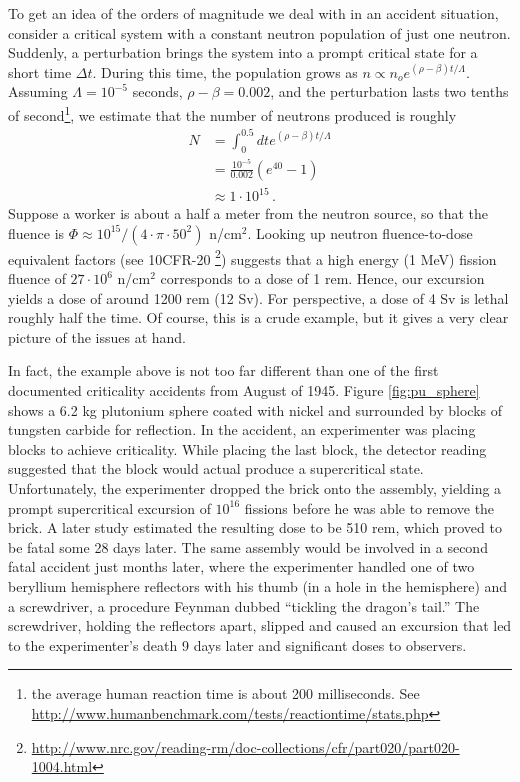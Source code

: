 To get an idea of the orders of magnitude we deal with in an accident
situation, consider a critical system with a constant neutron population
of just one neutron.  Suddenly, a perturbation brings the system
into a prompt critical state for a short time $\Delta t$.  During this
time, the population grows as $n \propto n_o e^{(\rho-\beta)t/\Lambda}$.  
Assuming $\Lambda = 10^{-5}$ seconds, $\rho-\beta = 0.002$, and the perturbation 
lasts two tenths of second\footnote{the average human reaction time is
about 200 milliseconds. 
See \url{http://www.humanbenchmark.com/tests/reactiontime/stats.php}}, 
we estimate that the number of neutrons produced is 
roughly
\begin{equation}
\begin{split}
 N &= \int^{0.5}_0 dt e^{(\rho-\beta)t/\Lambda} \\
   &= \frac{10^{-5}}{0.002} (e^{40} - 1) \\
   &\approx 1 \cdot 10^{15} \, .
\end{split}
\end{equation}
Suppose a worker is about a half a meter from the neutron source, so that
the fluence is $\Phi \approx 10^{15} / (4\cdot \pi \cdot 50^2)$ n/cm$^2$.
Looking up neutron fluence-to-dose equivalent factors (see 10CFR-20
\footnote{\url{http://www.nrc.gov/reading-rm/doc-collections/cfr/part020/part020-1004.html}}) 
suggests
that a high energy (1 MeV) fission fluence of $27\cdot 10^6$  n/cm$^2$
corresponds
to a dose of 1 rem.  Hence, our excursion yields a dose of around
1200 rem (12 Sv).  For perspective, a dose of 4 Sv is lethal roughly 
half the time.  Of course, this is a crude example, but it gives a 
very clear picture of the issues at hand.

In fact, the example above is not too far different than one of the first
documented criticality accidents from August of 1945.
Figure \ref{fig:pu_sphere} shows
a 6.2 kg plutonium sphere coated with nickel and surrounded by
blocks of tungsten carbide for reflection.  In the accident, an 
experimenter was placing blocks to achieve criticality.  While
placing the last block, the detector reading suggested that 
the block would actual produce a supercritical state.  Unfortunately,
the experimenter dropped the brick onto the assembly, yielding
a prompt supercritical excursion of $10^{16}$ fissions
before he was able to remove the brick.  A later study estimated
the resulting dose to be 510 rem, which proved to be fatal some
28 days later.  The same assembly would be involved in a second
fatal accident just months later, where the experimenter handled
one of two beryllium hemisphere reflectors
 with his thumb (in a hole in the 
hemisphere) and a screwdriver, a procedure Feynman dubbed
``tickling the dragon's tail.''   The screwdriver, holding the 
reflectors apart, slipped and caused an excursion that led to 
the experimenter's death 9 days later and significant doses
to observers.

